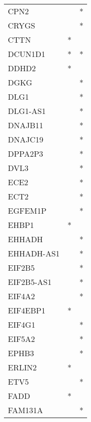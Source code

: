 \begin{longtable}{lcc}
CPN2             &                &          * \\
CRYGS            &                &          * \\
CTTN             &              * &            \\
DCUN1D1          &              * &          * \\
DDHD2            &              * &            \\
DGKG             &                &          * \\
DLG1             &                &          * \\
DLG1-AS1         &                &          * \\
DNAJB11          &                &          * \\
DNAJC19          &                &          * \\
DPPA2P3          &                &          * \\
DVL3             &                &          * \\
ECE2             &                &          * \\
ECT2             &                &          * \\
EGFEM1P          &                &          * \\
EHBP1            &              * &            \\
EHHADH           &                &          * \\
EHHADH-AS1       &                &          * \\
EIF2B5           &                &          * \\
EIF2B5-AS1       &                &          * \\
EIF4A2           &                &          * \\
EIF4EBP1         &              * &            \\
EIF4G1           &                &          * \\
EIF5A2           &                &          * \\
EPHB3            &                &          * \\
ERLIN2           &              * &            \\
ETV5             &                &          * \\
FADD             &              * &            \\
FAM131A          &                &          * \\

\end{longtable}
